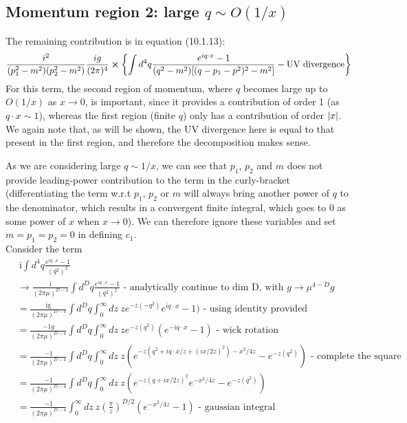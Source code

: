 \documentclass{article}
\begin{document}
\subsection{Momentum region 2: large $q \sim O(1/x)$}
The remaining contribution is in equation (10.1.13):
\begin{equation}
    \frac{i^2}{(p_1^2-m^2)(p_2^2-m^2)}\frac{ig}{(2\pi)^4}\cross\qty{\int d^4q \frac{e^{iq\cdot x}-1}{(q^2-m^2)[(q-p_1-p^2)^2-m^2]}-\text{UV divergence}}
\end{equation}
For this term, the second region of momentum, where $q$ becomes large up to $O(1/x)$ as $x \rightarrow 0$, is important, since it provides a contribution of order 1 (as $q\cdot x \sim 1$), whereas the first region (finite $q$) only has a contribution of order $\abs{x}$. We again note that, as will be shown, the UV divergence here is equal to that present in the first region, and therefore the decomposition makes sense. 

As we are considering large $q \sim 1/x$, we can see that $p_1$, $p_2$ and $m$ does not provide leading-power contribution to the term in the curly-bracket (differentiating the term w.r.t $p_1$, $p_2$ or $m$ will always bring another power of $q$ to the denominator, which results in a convergent finite integral, which goes to $0$ as some power of $x$ when $x \rightarrow 0$). We can therefore ignore these variables and set $m=p_1=p_2=0$ in defining $c_1$. \\

Consider the term
\begin{equation}
\begin{split}
    &\ \text{i}\int d^4q\frac{e^{iq\cdot x}-1}{(q^2)^2} \\
    &\rightarrow\frac{\text{i}}{(2\pi\mu)^{D-4}}\int d^Dq\frac{e^{iq\cdot x}-1}{(q^2)^2} \text{ - analytically continue to dim D, with } g \rightarrow \mu^{4-D}g\\
    &= \frac{\text{ig}}{(2\pi\mu)^{D-4}}\int d^Dq \int_0^\infty  dz\ z e^{-z(-q^2)} e^{iq\cdot x}-1) \text{ - using identity provided}\\
    &= \frac{-1g}{(2\pi\mu)^{D-4}}\int d^Dq \int_0^\infty  dz\ z e^{-z(q^2)} (e^{-iq\cdot x}-1) \text{ - wick rotation}\\
    &= \frac{-1}{(2\pi\mu)^{D-4}}\int d^Dq \int_0^\infty  dz\ z (e^{-z(q^2+iq\cdot x/z+(ix/2z)^2)-x^2/4z}-e^{-z(q^2)}) \text{ - complete the square}\\
    &= \frac{-1}{(2\pi\mu)^{D-4}}\int d^Dq \int_0^\infty  dz\ z (e^{-z(q+ix/2z)^2}e^{-x^2/4z}-e^{-z(q^2)})\\
    &= \frac{-1}{(2\pi\mu)^{D-4}}\int_0^\infty  dz\ z (\frac{\pi}{z})^{D/2}(e^{-x^2/4z}-1)\text{ - gaussian integral}\\
\end{split}
\end{equation}
\end{document}
